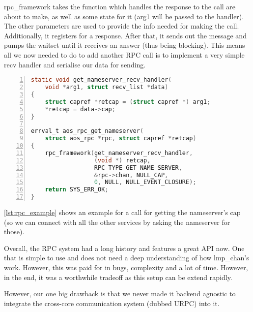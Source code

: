 rpc\_framework takes 
the function which handles the response to the call are about to make, as 
well as some state for it (arg1 will be passed to the handler). 
The other parameters are used to provide the info needed for making the call.
Additionally, it registers for a response. After that, it sends out the message and 
pumps the waitset until it receives an answer (thus being blocking). 
This means all we now needed to do to add another RPC call is to implement a 
very simple recv handler and 
serialise our data for sending.
\medskip

\begin{lstlisting}[caption={aos\_rpc\_get with helper function}, 
label=lst:rpc_example, numbers=left, stepnumber=1, float, floatplacement=tl, 
frame=tb, language=c]
static void get_nameserver_recv_handler(
    void *arg1, struct recv_list *data)
{
    struct capref *retcap = (struct capref *) arg1;
    *retcap = data->cap;
}

errval_t aos_rpc_get_nameserver(
    struct aos_rpc *rpc, struct capref *retcap)
{
    rpc_framework(get_nameserver_recv_handler,
                  (void *) retcap,
                  RPC_TYPE_GET_NAME_SERVER, 
                  &rpc->chan, NULL_CAP,
                  0, NULL, NULL_EVENT_CLOSURE);
    return SYS_ERR_OK;
}
\end{lstlisting}

\autoref{lst:rpc_example} shows an example for a call for getting the 
nameserver's cap (so we can connect with all the other services by asking the 
nameserver for those).
\medskip

Overall, the RPC system had a long history and features a great API now. One that is  simple to use 
and does not need a deep understanding of how lmp\_chan's work. However, this 
was paid for in bugs, complexity and a lot of time. However, in the end, it was a worthwhile 
tradeoff as this setup can be extend rapidly.
\medskip

However, our one big drawback is that we never made it backend agnostic to integrate 
the cross-core communication system (dubbed URPC) into it.
